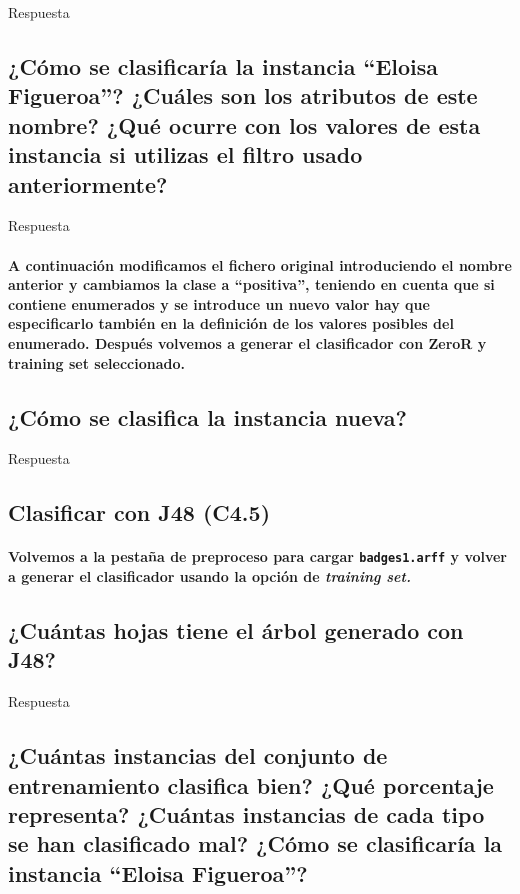 \documentclass[12pt]{article}
\begin{document}
Respuesta

\subsection{\small ¿Cómo se clasificaría la instancia ``Eloisa Figueroa''? ¿Cuáles son
los atributos de este nombre? ¿Qué ocurre con los valores de esta instancia
si utilizas el filtro usado anteriormente?}

Respuesta

\paragraph{\small A continuación modificamos el fichero original introduciendo el nombre
anterior y cambiamos la clase a ``positiva'', teniendo en cuenta que si contiene
enumerados y se introduce un nuevo valor hay que especificarlo también en la
definición de los valores posibles del enumerado. Después volvemos a generar el
clasificador con ZeroR y training set seleccionado.}
\subsection{\small ¿Cómo se clasifica la instancia nueva?}

Respuesta

\newpage

\begin{center}
\section{Clasificar con J48 (C4.5)}
\end{center}

\paragraph{\small Volvemos a la pestaña de preproceso para cargar \texttt{badges1.arff}
y volver a generar el clasificador usando la opción de \emph{training set.}}

\subsection{\small ¿Cuántas hojas tiene el árbol generado con J48?}

Respuesta

\subsection{\small ¿Cuántas instancias del conjunto de entrenamiento clasifica bien?
¿Qué porcentaje representa? ¿Cuántas instancias de cada tipo se han clasificado
mal? ¿Cómo se clasificaría la instancia ``Eloisa Figueroa''?}
\end{document}
